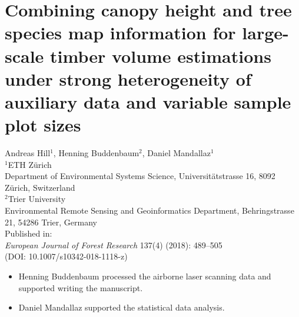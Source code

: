 \chapter{Combining canopy height and tree species map information for large-scale timber volume estimations under strong heterogeneity of auxiliary data and variable sample plot sizes}
\label{chap:regmod}
{\large Andreas Hill$^1$, Henning Buddenbaum$^2$, Daniel Mandallaz$^1$}\\

\vspace{3cm}
\noindent
$^1$ETH Z\"urich\\Department of Environmental Systems Science, Universit\"atstrasse 16, 8092 Z\"urich, Switzerland \\

\noindent
$^2$Trier University\\Environmental Remote Sensing and Geoinformatics Department, Behringstrasse 21, 54286 Trier, Germany \\



\vspace{\fill}
\noindent
Published in:\\
\textit{European Journal of Forest Research} 137(4) (2018): 489–505\\
(DOI: 10.1007/s10342-018-1118-z)

\newpage
\thispagestyle{plain}
\renewcommand{\labelitemi}{--}
\begin{itemize}
	\item Henning Buddenbaum processed the airborne laser scanning data and supported writing the manuscript.
	\item Daniel Mandallaz supported the statistical data analysis.
\end{itemize}

\clearpage
